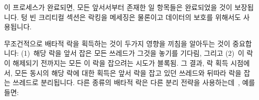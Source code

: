 {\begin{enumerate}
	\fi

	\end{enumerate}

	이 프로세스가 완료되면, 모든 앞서서부터 존재한 일 항목들은 완료되었을
	것이 보장됩니다.
	텅 빈 크리티컬 섹션은 락킹을 메세징은 물론이고 데이터의 보호를 위해서도
	사용됩니다.

}\QuickQuizEnd

\QuickQuizLabel{\QlockingQemptycriticalsection}

무조건적으로 배타적 락을 획득하는 것이 두가지 영향을 끼침을 알아두는 것이
중요합니다:
(1)~해당 락을 앞서 잡은 모든 쓰레드가 그것을 놓기를 기다림, 그리고
(2)~이 락이 해제되기 전까지는 모든 이 락을 잡으려는 시도가 블록됨.
그 결과, 락 획득 시점에서, 모든 동시의 해당 락에 대한 획득은 앞서 락을 잡고
있던 쓰레드와 뒤따라 락을 잡는 쓰레드로 분리됩니다.
다른 종류의 배타적 락은 다른 분리 전략을
사용하는데~\cite{BjoernBrandenburgPhD,Guerraoui:2019:LPA:3319851.3301501}, 예를
들면:

